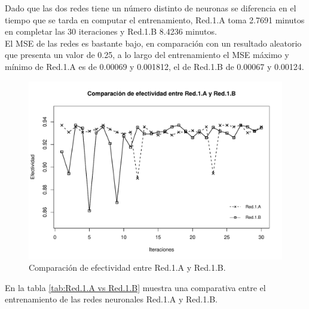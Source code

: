\documentclass{iccmemoria}
\begin{document}
Dado que las dos redes tiene un número distinto de neuronas se diferencia en el tiempo que se tarda en computar el entrenamiento, Red.1.A toma 2.7691 minutos en completar las 30 iteraciones y Red.1.B 8.4236 minutos.\\

El MSE de las redes es bastante bajo, en comparación con un resultado aleatorio que presenta un valor de 0.25, a lo largo del entrenamiento el MSE máximo y mínimo de Red.1.A es de 0.00069 y 0.001812, el de Red.1.B de 0.00067 y 0.00124.\\


\begin{figure}[H]
  \centering
  \includegraphics[width = 450pt]{images/net_1_a_vs_net_1_b.pdf}
  \caption[Efectividad de Red.1.A vs Red.1.B.]{Comparación de efectividad entre Red.1.A y Red.1.B.}
  \label{fig:net.1.a vs net.1.b}
\end{figure}

En la tabla \ref{tab:Red.1.A vs Red.1.B} muestra una comparativa entre el entrenamiento de las redes neuronales Red.1.A y Red.1.B.\\

\begin{table}[H]
\caption{Datos comparativos del entrenamiento en Red.1.A  y Red.1.B}
\label{tab:Red.1.A vs Red.1.B}
\end{table}
\end{document}
